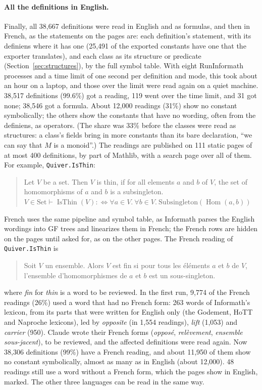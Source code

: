 \documentclass{easychair}
\newcommand{\ttt}[1]{\texttt{#1}}
\newcommand{\reading}[1]{\begin{quote}\small #1\end{quote}}
\begin{document}
\paragraph{All the definitions in English.}
\label{sec:allread}
Finally, all 38,667 definitions were read in English and as formulas, and then in French, as the statements on the
pages are: each definition's statement, with its definiens where it has one (25,491 of the
exported constants have one that the exporter translates), and each class as its structure or
predicate (Section~\ref{sec:structures}), by the full symbol table. With eight
RunInformath processes and a time limit of one second per definition and mode, this took about
an hour on a laptop, and those over the limit were read again on a quiet machine. 38,517
definitions (99.6\%) got a reading, 119 went over the time limit, and 31 got none; 38,546 got a
formula. About 12,000 readings (31\%) show no constant symbolically; the others show the
constants that have no wording, often from the definiens, as operators. (The share was 33\%
before the classes were read as structures: a class's fields bring in more constants than its
bare declaration, ``we can say that $M$ is a monoid''.) The readings are published on 111
static pages of at most 400 definitions, by part of Mathlib, with a search page over all of
them. For example, \ttt{Quiver.IsThin}:
\reading{Let $V$ be a set. Then $V$ is thin, if for all elements $a$ and $b$ of $V$, the set of
homomorphisms of $a$ and $b$ is a subsingleton.\\[1mm]
$V \in \mathrm{Set} \vdash \operatorname{IsThin}(V) :\Leftrightarrow \forall a \in V .\ \forall b \in V .\
\mathrm{Subsingleton}(\operatorname{Hom}(a, b))$}
\noindent French uses the same pipeline and symbol table, as Informath parses the English
wordings into GF trees and linearizes them in French; the French rows are hidden on the pages
until asked for, as on the other pages. The French reading of \ttt{Quiver.IsThin} is
\reading{Soit $V$ un ensemble. Alors $V$ est fin si pour tous les éléments $a$ et $b$ de $V$,
l'ensemble d'homomorphismes de $a$ et $b$ est un sous-singleton.}
\noindent where \emph{fin} for \emph{thin} is a word to be reviewed. In the first run, 9,774 of the
French readings (26\%) used a word that had no French form: 263 words of Informath's lexicon,
from its parts that were written for English only (the Godement, HoTT and Naproche lexicons),
led by \emph{opposite} (in 1,554 readings), \emph{lift} (1,053) and \emph{carrier} (950).
Claude wrote their French forms (\emph{opposé}, \emph{relèvement}, \emph{ensemble sous-jacent}),
to be reviewed, and the affected definitions were read again. Now 38,306 definitions (99\%)
have a French reading, and about 11,950 of them show no constant symbolically, almost as many
as in English (about 12,000). 48 readings still use a word without a French form, which the
pages show in English, marked. The
other three languages can be read in the same way.
\end{document}
